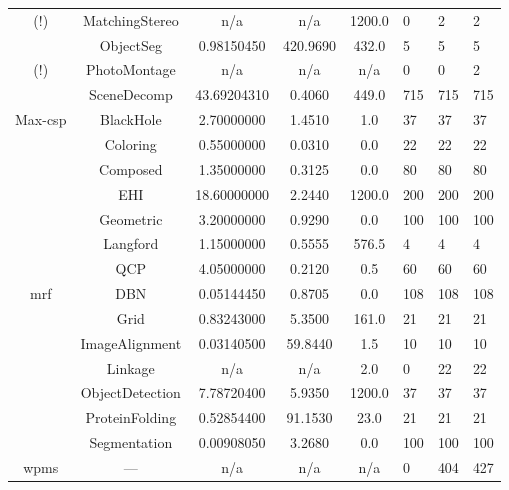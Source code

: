 \begin{table}
\begin{tabu}{ccS[round-mode=places,round-precision=3]
					  S[round-mode=places,round-precision=0]
					  S[round-mode=places,round-precision=0]HHH}
(!)				&	MatchingStereo	&	{n/a}	&	{n/a}	&	1200.0	&	0	&	2	&	2 \\
				&	ObjectSeg	&	0.98150450	&	420.9690	&	432.0	&	5	&	5	&	5 \\
(!)				&	PhotoMontage	&	{n/a}	&	{n/a}	&	{n/a}	&	0	&	0	&	2 \\
				&	SceneDecomp	&	43.69204310	&	0.4060	&	449.0	&	715	&	715	&	715 \\
			Max-\acrshort{csp}	&	BlackHole	&	2.70000000	&	1.4510	&	1.0	&	37	&	37	&	37 \\
				&	Coloring	&	0.55000000	&	0.0310	&	0.0	&	22	&	22	&	22 \\
				&	Composed	&	1.35000000	&	0.3125	&	0.0	&	80	&	80	&	80 \\
				&	EHI	&	18.60000000	&	2.2440	&	1200.0	&	200	&	200	&	200 \\
				&	Geometric	&	3.20000000	&	0.9290	&	0.0	&	100	&	100	&	100 \\
				&	Langford	&	1.15000000	&	0.5555	&	576.5	&	4	&	4	&	4 \\
				&	QCP	&	4.05000000	&	0.2120	&	0.5	&	60	&	60	&	60 \\
			\acrshort{mrf}	&	DBN	&	0.05144450	&	0.8705	&	0.0	&	108	&	108	&	108 \\
				&	Grid	&	0.83243000	&	5.3500	&	161.0	&	21	&	21	&	21 \\
	&	ImageAlignment	&	0.03140500	&	59.8440	&	1.5	&	10	&	10	&	10 \\
	&	Linkage	&	{n/a}	&	{n/a}	&	2.0	&	0	&	22	&	22 \\
				&	ObjectDetection	&	7.78720400	&	5.9350	&	1200.0	&	37	&	37	&	37 \\
	&	ProteinFolding	&	0.52854400	&	91.1530	&	23.0	&	21	&	21	&	21 \\
				&	Segmentation	&	0.00908050	&	3.2680	&	0.0	&	100	&	100	&	100 \\
	\acrshort{wpms}	&	---	&	{n/a}	&	{n/a}	&	{n/a}	&	0	&	404	&	427 \\
		\bottomrule
	\end{tabu}
\end{table}
